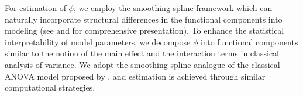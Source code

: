 \bigskip

For estimation of $\phi$, we employ the smoothing spline framework which can naturally incorporate structural differences in the functional components into modeling (see \cite{kimeldorf1971some} and \cite{wahba1990spline} for comprehensive presentation). To enhance the statistical interpretability of model parameters, we decompose $\phi$ into functional components similar to the notion of the main effect and the interaction terms in classical analysis of variance. We adopt the smoothing spline analogue of the classical ANOVA model proposed by \cite{gu2013smoothing}, and estimation is achieved through similar computational strategies.

%
